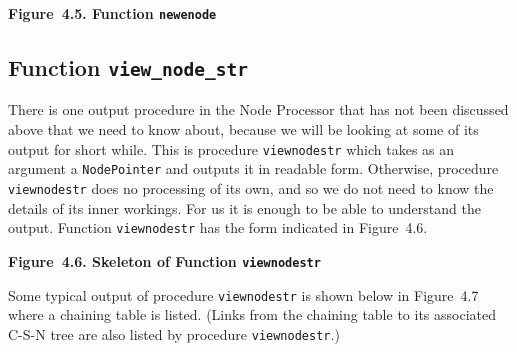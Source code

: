 \documentclass{article}
\begin{document}
\bigbreak
\begin{minipage}{\textwidth}
\vbox{}
\bigbreak
{}
\textbf{Figure~4.5. Function \texttt{newenode}}
\end{minipage}
\bigbreak


\subsection{Function \textbf{\texttt{view\_node\_str}}}

There is one output procedure in the Node Processor that has not
been discussed above that we need to know about, because we will
be looking at some of its output for short while. This is
procedure \texttt{viewnodestr} which takes as an argument a
\texttt{NodePointer} and outputs it in readable form.
Otherwise, procedure \texttt{viewnodestr} does no processing of its
own, and so we do not need to know the details of its inner
workings. For us it is enough to be able to understand the
output. Function \texttt{viewnodestr} has the form indicated in
Figure~4.6.

\bigbreak
\begin{minipage}{\textwidth}
\vbox{}
\bigbreak
{}
\textbf{Figure~4.6. Skeleton of Function \texttt{viewnodestr}}
\end{minipage}
\bigbreak

Some typical output of procedure \texttt{viewnodestr} is shown
below in Figure~4.7 where a chaining table is listed.  (Links
from the chaining table to its associated C-S-N tree are also
listed by procedure \texttt{viewnodestr}.)
\end{document}
